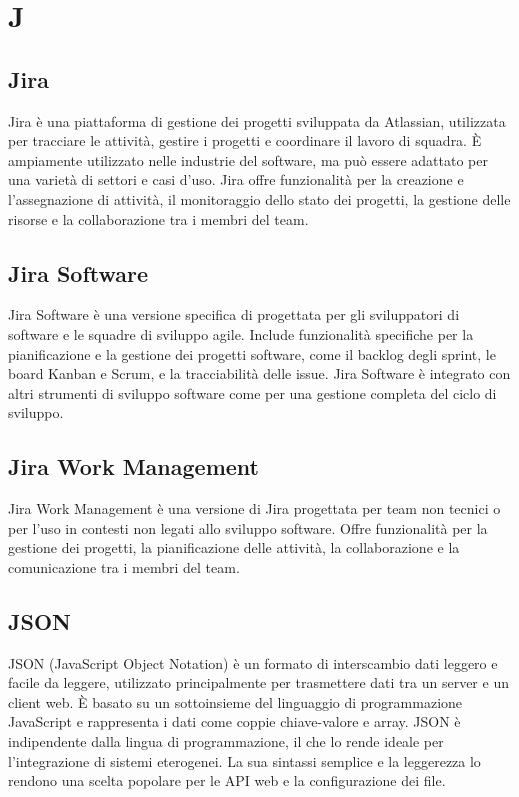 \section{J}

\vspace{2em}
\subsection*{Jira}
\par Jira è una piattaforma di gestione dei progetti sviluppata da Atlassian, utilizzata per tracciare le attività, gestire i progetti e coordinare il lavoro di squadra. È ampiamente utilizzato nelle industrie del software, ma può essere adattato per una varietà di settori e casi d'uso. Jira offre funzionalità per la creazione e l'assegnazione di attività, il monitoraggio dello stato dei progetti, la gestione delle risorse e la collaborazione tra i membri del team.

\vspace{2em}
\subsection*{Jira Software}
\par Jira Software è una versione specifica di  progettata per gli sviluppatori di software e le squadre di sviluppo agile. Include funzionalità specifiche per la pianificazione e la gestione dei progetti software, come il backlog degli sprint, le board Kanban e Scrum, e la tracciabilità delle issue. Jira Software è integrato con altri strumenti di sviluppo software come  per una gestione completa del ciclo di sviluppo.

\vspace{2em}
\subsection*{Jira Work Management}
\par Jira Work Management è una versione di Jira progettata per team non tecnici o per l'uso in contesti non legati allo sviluppo software. Offre funzionalità per la gestione dei progetti, la pianificazione delle attività, la collaborazione e la comunicazione tra i membri del team.

\vspace{2em}
\subsection*{JSON}
\par JSON (JavaScript Object Notation) è un formato di interscambio dati leggero e facile da leggere, utilizzato principalmente per trasmettere dati tra un server e un client web. È basato su un sottoinsieme del linguaggio di programmazione JavaScript e rappresenta i dati come coppie chiave-valore e array. JSON è indipendente dalla lingua di programmazione, il che lo rende ideale per l'integrazione di sistemi eterogenei. La sua sintassi semplice e la leggerezza lo rendono una scelta popolare per le API web e la configurazione dei file.

